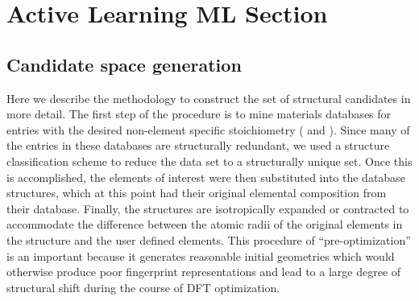 

\section{Active Learning ML Section}  %
%

\subsection{Candidate space generation}  %
%


%
Here we describe the methodology to construct the set of structural candidates in more detail.
%
The first step of the procedure is to mine materials databases for entries with the desired non-element specific stoichiometry ( \ABtwo and \ABthree).
%
Since many of the entries in these databases are structurally redundant,
we used a structure classification scheme to reduce the data set to a structurally unique set.
%
Once this is accomplished, the elements of interest were then substituted into the database structures,
which at this point had their original elemental composition from their database.
%
Finally, the structures are isotropically expanded or contracted to accommodate the difference between the atomic radii of the original elements in the structure and the user defined elements.
%
This procedure of ``pre-optimization'' is an important because it generates reasonable initial geometries which would otherwise produce poor fingerprint representations and lead to a large degree of structural shift during the course of DFT optimization.


